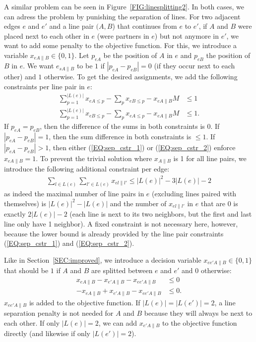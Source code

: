 \documentclass{llncs}
\begin{document}
A similar problem can be seen in Figure~\ref{FIG:linesplitting2}. In both cases, we can adress the problem by punishing the separation of lines. For two adjacent edges $e$ and $e'$ and a line pair $(A, B$) that continues from $e$ to $e'$, if $A$ and $B$ were placed next to each other in $e$ (were partners in $e$) but not anymore in $e'$, we want to add some penalty to the objective function. For this, we introduce a variable $x_{eA\|B} \in \{0, 1\}$. Let $p_{eA}$ be the position of $A$ in $e$ and $p_{eB}$ the position of $B$ in $e$. We want $e_{sA\|B}$ to be $1$ if $\left|p_{eA} - p_{eB}\right| = 0$ (if they occur next to each other) and $1$ otherwise. To get the desired assignments, we add the following constraints per line pair in $e$:
\begin{align}
	\sum_{p=1}^{|L(e)|} x_{eA\leq p} - \sum_{p} x_{eB\leq p} - x_{eA\|B} M &\leq 1 \label{EQ:sep_cstr_1} \\
	\sum_{p=1}^{|L(e)|} x_{eB\leq p} - \sum_{p} x_{eA\leq p} - x_{eA\|B} M &\leq 1. \label{EQ:sep_cstr_2}
\end{align}
If $p_{eA} = p_{eB}$, then the difference of the sums in both constraints is 0. If $|p_{eA} - p_{eB}| = 1$, then the sum difference in both constraints is $\leq 1$. If $|p_{eA} - p_{eB}| > 1$, then either (\ref{EQ:sep_cstr_1}) or (\ref{EQ:sep_cstr_2}) enforce $x_{eA\|B} = 1$. To prevent the trivial solution where $x_{A\|B}$ is 1 for all line pairs, we introduce the following additional constraint per edge:
\begin{align*}
	\sum_{l \in L(e)}\sum_{l' \in L(e)} x_{el\|l'} \leq |L(e)|^2 - 3|L(e)| - 2
\end{align*}
as indeed the maximal number of line pairs in $e$ (excluding lines paired with themselves) is $|L(e)|^2 - |L(e)|$ and the number of $x_{el\|l'}$ in $e$ that are 0 is exactly $2|L(e)| - 2$ (each line is next to its two neighbors, but the first and last line only have 1 neighbor). A fixed constraint is not necessary here, however, because the lower bound is already provided by the line pair constraints (\ref{EQ:sep_cstr_1}) and (\ref{EQ:sep_cstr_2}).

Like in Section~\ref{SEC:improved}, we introduce a decision variable $x_{ee'A\|B} \in \{0, 1\}$ that should be $1$ if $A$ and $B$ are splitted between $e$ and $e'$ and $0$ otherwise:
\begin{align*}
	x_{eA\|B} - x_{e'A\|B} - x_{ee'A\|B} &\leq 0 \\
	-x_{eA\|B} + x_{e'A\|B} - x_{ee'A\|B} &\leq 0.
\end{align*}
$x_{ee'A\|B}$ is added to the objective function. If $|L(e)| = |L(e')| = 2$, a line separation penalty is not needed for $A$ and $B$ because they will always be next to each other. If only $|L(e)| = 2$, we can add $x_{e'A\|B}$ to the objective function directly (and likewise if only $|L(e')|=2$).
\end{document}
